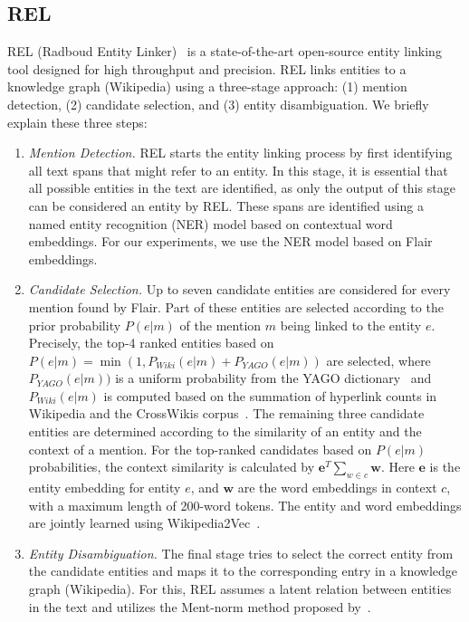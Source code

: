 \subsection{REL}
REL (Radboud Entity Linker)~\citep{rel} is a state-of-the-art open-source entity linking tool designed for high throughput and precision. REL links entities to a knowledge graph (Wikipedia) using a three-stage approach: (1) mention detection, (2) candidate selection, and (3) entity disambiguation. We briefly explain these three steps:

\begin{enumerate}
	\item \emph{Mention Detection.} REL starts the entity linking process by first identifying all text spans that might refer to an entity. In this stage, it is essential that all possible entities in the text are identified, as only the output of this stage can be considered an entity by REL. These spans are identified using a named entity recognition (NER) model based on contextual word embeddings. For our experiments, we use the NER model based on Flair embeddings. 
	\item \emph{Candidate Selection.} Up to seven candidate entities are considered for every mention found by Flair. Part of these entities are selected according to the prior probability $P(e|m)$ of the mention $m$ being linked to the entity $e$. Precisely, the top-4 ranked entities based on $P(e|m) = \min(1, P_{\mathit{Wiki}}(e|m) + P_{\mathit{YAGO}}(e|m))$ are selected, where $P_{\mathit{YAGO}}(e|m))$ is a uniform probability from the YAGO dictionary~\citep{yago} and $P_{\mathit{Wiki}}(e|m)$ is computed based on the summation of hyperlink counts in Wikipedia and the CrossWikis corpus~\citep{crosswiki}.
	The remaining three candidate entities are determined according to the similarity of an entity and the context of a mention. For the top-ranked candidates based on $P(e|m)$ probabilities, the context similarity is calculated by $\mathbf{e}^T \sum_{w\in c}\mathbf{w}$. Here $\mathbf{e}$ is the entity embedding for entity $e$, and $\mathbf{w}$ are the word embeddings in context $c$, with a maximum length of 200-word tokens. The entity and word embeddings are jointly learned using Wikipedia2Vec~\citep{wikipedia2vec}. 
	\item \emph{Entity Disambiguation.} The final stage tries to select the correct entity from the candidate entities and maps it to the corresponding entry in a knowledge graph (Wikipedia). For this, REL assumes a latent relation between entities in the text and utilizes the Ment-norm method proposed by~\citet{ED-paper}.
\end{enumerate}

